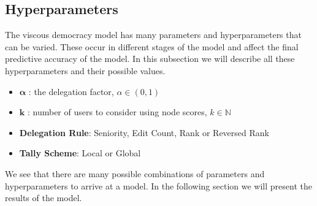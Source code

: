 \subsection{Hyperparameters}
The viscous democracy model has many parameters and hyperparameters that can be varied. These occur in different stages of the model and affect the final predictive accuracy of the model. In this subsection we will describe all these hyperparameters and their possible values.

\begin{itemize}
    \item $\boldsymbol{\alpha}$ : the delegation factor, $\alpha\in (0,1)$
    \item $\mathbf{k}$ : number of users to consider using node scores, $k \in \mathbb{N}$
    \item \textbf{Delegation Rule}: Seniority, Edit Count, Rank or Reversed Rank 
    \item \textbf{Tally Scheme}: Local or Global
\end{itemize}
We see that there are many possible combinations of parameters and hyperparameters to arrive at a model. In the following section we will present the results of the model. 
